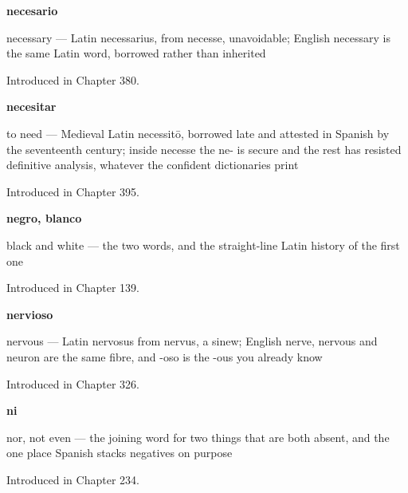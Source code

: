 \noindent\begin{minipage}[t]{\linewidth}
\raggedright
\textbf{necesario}\par
\small necessary — Latin necessarius, from necesse, unavoidable; English necessary is the same Latin word, borrowed rather than inherited\par
\footnotesize Introduced in Chapter 380.
\end{minipage}\par\medskip

\noindent\begin{minipage}[t]{\linewidth}
\raggedright
\textbf{necesitar}\par
\small to need — Medieval Latin necessitō, borrowed late and attested in Spanish by the seventeenth century; inside necesse the ne- is secure and the rest has resisted definitive analysis, whatever the confident dictionaries print\par
\footnotesize Introduced in Chapter 395.
\end{minipage}\par\medskip

\noindent\begin{minipage}[t]{\linewidth}
\raggedright
\textbf{negro, blanco}\par
\small black and white — the two words, and the straight-line Latin history of the first one\par
\footnotesize Introduced in Chapter 139.
\end{minipage}\par\medskip

\noindent\begin{minipage}[t]{\linewidth}
\raggedright
\textbf{nervioso}\par
\small nervous — Latin nervosus from nervus, a sinew; English nerve, nervous and neuron are the same fibre, and -oso is the -ous you already know\par
\footnotesize Introduced in Chapter 326.
\end{minipage}\par\medskip

\noindent\begin{minipage}[t]{\linewidth}
\raggedright
\textbf{ni}\par
\small nor, not even — the joining word for two things that are both absent, and the one place Spanish stacks negatives on purpose\par
\footnotesize Introduced in Chapter 234.
\end{minipage}\par\medskip

